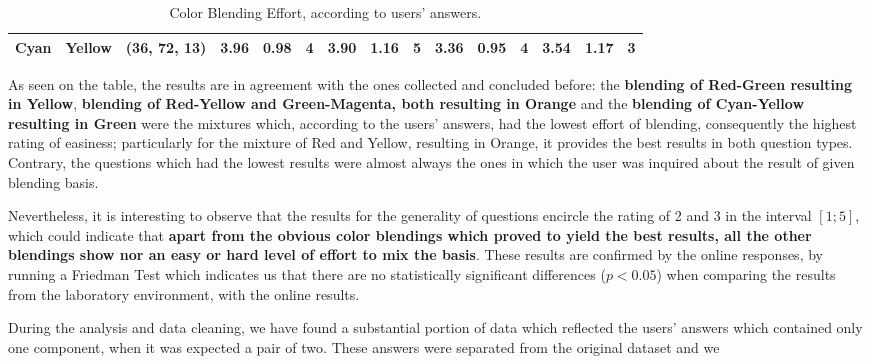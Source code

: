 \begin{table}[htbp]
{\begin{tabular}{@{}ccclcccccccccccc@{}}
    Cyan                    & \multicolumn{1}{c|}{Yellow}                    & \multicolumn{2}{c|}{\cellcolor[HTML]{00FF00}(36, 72, 13)}  & \multicolumn{1}{c|}{3.96} & \multicolumn{1}{c|}{0.98}  & \multicolumn{1}{c|}{4}                                  & \multicolumn{1}{c|}{3.90} & \multicolumn{1}{c|}{1.16}  & \multicolumn{1}{c||}{\cellcolor[HTML]{32CB00}\textbf{5}} & \multicolumn{1}{c|}{3.36}                   & \multicolumn{1}{c|}{0.95}                   & \multicolumn{1}{c|}{4}                                  & \multicolumn{1}{c|}{3.54}                   & \multicolumn{1}{c|}{1.17}                   & \multicolumn{1}{c|}{3}                                                    \\ \bottomrule
  \end{tabular}}
  \caption[Color Blending Effort, according to users' answers.]{Color Blending Effort, according to users' answers.}
  \vspace{-5pt}
  \label{table:difficulties_blendings}
\end{table}
%
\newpage
As seen on the table, the results are in agreement with the ones collected and concluded before: the \textbf{blending of Red-Green resulting in Yellow}, \textbf{blending of Red-Yellow and Green-Magenta, both resulting in Orange} and the
\textbf{blending of Cyan-Yellow resulting in Green} were the mixtures which, according to the users' answers, had the lowest effort of blending, consequently the highest rating of easiness; particularly for the mixture of Red and Yellow, resulting in
Orange, it provides the best results in both question types. Contrary, the questions which had the lowest results were almost always the ones in which the user was inquired about the result of given blending basis. \par
%
Nevertheless, it is interesting to observe that the results for the generality of questions encircle the rating of 2 and 3 in the interval $[1 ; 5]$, which could indicate that \textbf{apart from the obvious color blendings which proved to yield the
best results, all the other blendings show nor an easy or hard level of effort to mix the basis}. These results are confirmed by the online responses, by running a Friedman Test which indicates us that there are no statistically significant differences
($p < 0.05$) when comparing the results from the laboratory environment, with the online results. \par
%
During the analysis and data cleaning, we have found a substantial portion of data which reflected the users' answers which contained only one component, when it was expected a pair of two. These answers were separated from the original dataset and we
